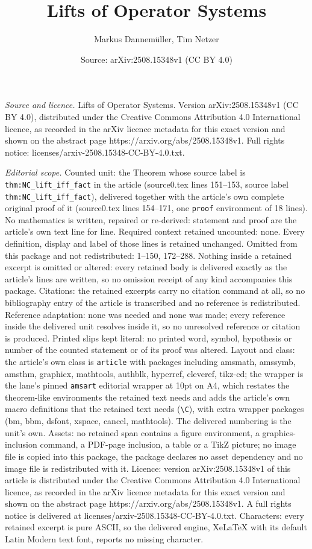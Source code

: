 \documentclass[10pt,a4paper]{amsart}
\title[Lifts of Operator Systems]{Lifts of Operator Systems}
\author{Markus Dannem\"uller, Tim Netzer}
\date{Source: arXiv:2508.15348v1 (CC BY 4.0)}
\begin{document}
\maketitle

\noindent\emph{Source and licence.} Lifts of Operator Systems. Version arXiv:2508.15348v1 (CC BY 4.0), distributed under the Creative Commons Attribution 4.0 International licence, as recorded in the arXiv licence metadata for this exact version and shown on the abstract page https://arxiv.org/abs/2508.15348v1. Full rights notice: licenses/arxiv-2508.15348-CC-BY-4.0.txt.\par\smallskip

\noindent\textit{Editorial scope.} Counted unit: the Theorem whose source label is \texttt{thm:NC\_lift\_iff\_fact} in the article (source0.tex lines 151--153, source label \texttt{thm:NC\_lift\_iff\_fact}), delivered together with the article's own complete original proof of it (source0.tex lines 154--171, one \texttt{proof} environment of 18 lines). No mathematics is written, repaired or re-derived: statement and proof are the article's own text line for line. Required context retained uncounted: none. Every definition, display and label of those lines is retained unchanged. Omitted from this package and not redistributed: 1--150, 172--288. Nothing inside a retained excerpt is omitted or altered: every retained body is delivered exactly as the article's lines are written, so no omission receipt of any kind accompanies this package. Citations: the retained excerpts carry no citation command at all, so no bibliography entry of the article is transcribed and no reference is redistributed. Reference adaptation: none was needed and none was made; every reference inside the delivered unit resolves inside it, so no unresolved reference or citation is produced. Printed slips kept literal: no printed word, symbol, hypothesis or number of the counted statement or of its proof was altered. Layout and class: the article's own class is \texttt{article} with packages including amsmath, amssymb, amsthm, graphicx, mathtools, authblk, hyperref, cleveref, tikz-cd; the wrapper is the lane's pinned \texttt{amsart} editorial wrapper at 10pt on A4, which restates the theorem-like environments the retained text needs and adds the article's own macro definitions that the retained text needs (\texttt{\textbackslash C}), with extra wrapper packages (bm, bbm, dsfont, xspace, cancel, mathtools). The delivered numbering is the unit's own. Assets: no retained span contains a figure environment, a graphics-inclusion command, a PDF-page inclusion, a table or a TikZ picture; no image file is copied into this package, the package declares no asset dependency and no image file is redistributed with it. Licence: version arXiv:2508.15348v1 of this article is distributed under the Creative Commons Attribution 4.0 International licence, as recorded in the arXiv licence metadata for this exact version and shown on the abstract page https://arxiv.org/abs/2508.15348v1. A full rights notice is delivered at licenses/arxiv-2508.15348-CC-BY-4.0.txt. Characters: every retained excerpt is pure ASCII, so the delivered engine, XeLaTeX with its default Latin Modern text font, reports no missing character.
\end{document}

